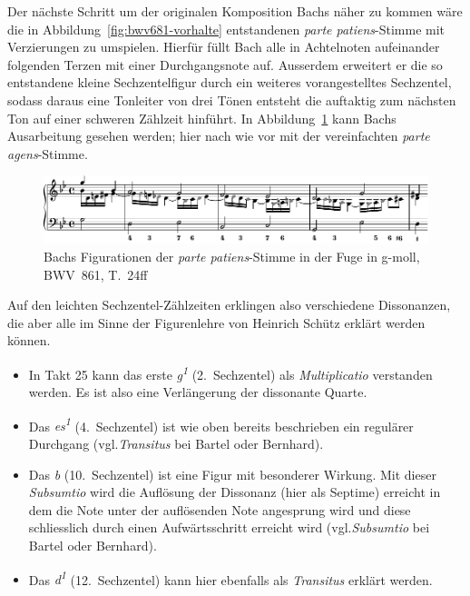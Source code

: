 Der nächste Schritt um der originalen Komposition Bachs näher zu kommen wäre die in Abbildung~\ref{fig:bwv681-vorhalte} entstandenen \emph{parte patiens}-Stimme mit Verzierungen zu umspielen.
Hierfür füllt Bach alle in Achtelnoten aufeinander folgenden Terzen mit einer Durchgangsnote auf.
Ausserdem erweitert er die so entstandene kleine Sechzentelfigur durch ein weiteres vorangestelltes Sechzentel, sodass daraus eine Tonleiter von drei Tönen entsteht die auftaktig zum nächsten Ton auf einer schweren Zählzeit hinführt.
In Abbildung~\ref{fig:bwv681-patiens-verziert} kann Bachs Ausarbeitung gesehen werden; hier nach wie vor mit der vereinfachten \emph{parte agens}-Stimme.

\begin{figure}[htbp]
	\centering
	\includegraphics{lilypond/g-moll/render/romanesca-patiens-verziert}
	\caption{Bachs Figurationen der \emph{parte patiens}-Stimme in der Fuge in g-moll, BWV~861, T.~24ff}
	\label{fig:bwv681-patiens-verziert}
\end{figure}

Auf den leichten Sechzentel-Zählzeiten erklingen also verschiedene Dissonanzen, die aber alle im Sinne der Figurenlehre von Heinrich Schütz\autocite{bernhard:kompositionslehre} erklärt werden können.

\begin{itemize}
\item
	In Takt 25 kann das erste \emph{g\textsuperscript{1}} (2.~Sechzentel) als \emph{Multiplicatio}\autocite[203f]{bartel:figurenlehre}\autocite[75]{bernhard:kompositionslehre} verstanden werden.
	Es ist also eine Verlängerung der dissonante Quarte.
\item
	Das \emph{es\textsuperscript{1}} (4.~Sechzentel) ist wie oben bereits beschrieben ein regulärer Durchgang (vgl.\emph{Transitus} bei Bartel\autocite[260ff]{bartel:figurenlehre} oder Bernhard\autocite[64f]{bernhard:kompositionslehre}).
\item
	Das \emph{b} (10.~Sechzentel) ist eine Figur mit besonderer Wirkung.
	Mit dieser \emph{Subsumtio} wird die Auflösung der Dissonanz (hier als Septime) erreicht in dem die Note unter der auflösenden Note angesprung wird und diese schliesslich durch einen Aufwärtsschritt erreicht wird (vgl.\emph{Subsumtio} bei Bartel\autocite[242ff]{bartel:figurenlehre} oder Bernhard\autocite[148f]{bernhard:kompositionslehre}).
\item
	Das \emph{d\textsuperscript{1}} (12.~Sechzentel) kann hier ebenfalls als \emph{Transitus} erklärt werden.
\end{itemize}

